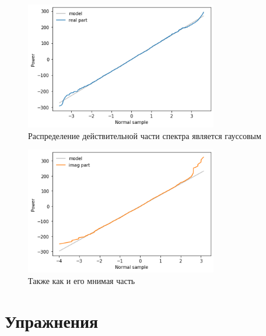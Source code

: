 \documentclass[a4paper, 12pt]{report}
\begin{document}
	\begin{figure}[H]
		\centering
		\includegraphics[width=0.75\textwidth]{gaus3.png}
		\caption{Распределение действительной части спектра является гауссовым}
		\label{fig:gaus3}
	\end{figure}
	\begin{figure}[H]
		\centering
		\includegraphics[width=0.75\textwidth]{gaus4.png}
		\caption{Также как и его мнимая часть}
		\label{fig:gaus4}
	\end{figure}

	\chapter{Упражнения}
\end{document}
